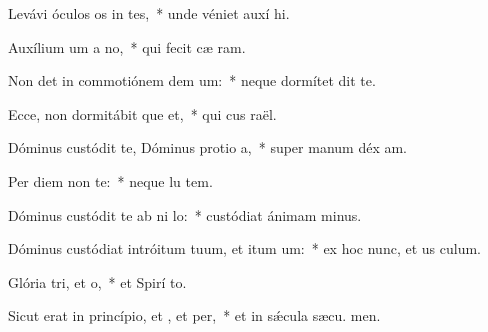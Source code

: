 \item Levávi óculos os in tes,~* unde véniet auxí hi.
\item Auxílium um a no,~* qui fecit cæ  ram.
\item Non det in commotiónem dem um:~* neque dormítet  dit te.
\item Ecce, non dormitábit que et,~* qui cus raël.
\item Dóminus custódit te, Dóminus protio a,~* super manum déx am.
\item Per diem  non  te:~* neque lu  tem.
\item Dóminus custódit te ab ni lo:~* custódiat ánimam  minus.
\item Dóminus custódiat intróitum tuum, et itum um:~* ex hoc nunc, et us  culum.
\item Glória tri, et o,~* et Spirí to.
\item Sicut erat in princípio, et , et per,~* et in sǽcula sæcu. men.
